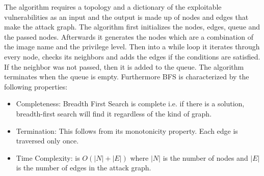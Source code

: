 The algorithm requires a topology and a dictionary of the exploitable vulnerabilities as an input and the output is made up of nodes and edges that make the attack graph. 
The algorithm first initializes the nodes, edges, queue and the passed nodes. Afterwards it generates the nodes which are a combination of the image name and the privilege level.
Then into a while loop it iterates through every node, checks its neighbors and adds the edges if the conditions are satisfied. If the neighbor was not passed, then it is added to the queue. The algorithm terminates when the queue is empty. Furthermore BFS is characterized by the following properties:
	
	\begin{itemize}
		\item Completeness: Breadth First Search is complete i.e. if there is a solution, breadth-first search will find it regardless of the kind of graph.
		\item Termination: This follows from its monotonicity property. Each edge is traversed only once.
		\item Time Complexity: is $O(|N| + |E|)$ where $|N|$ is the number of nodes and $|E|$ is the number of edges in the attack graph.
	\end{itemize}
